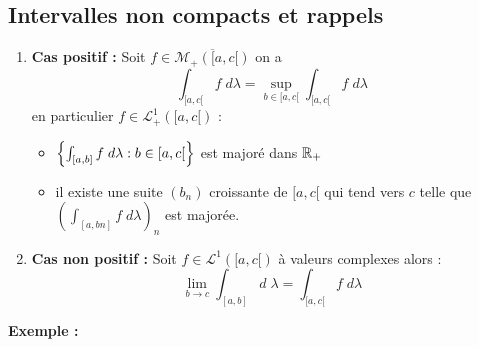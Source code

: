 \subsection{Intervalles non compacts et rappels}
\begin{theorem}
    \begin{enumerate}
        \item \textbf{Cas positif :} Soit $f \in \overline{\mathcal{M}_+([a,c[)}$ on a 
        \[ \boxed{ \int_{[a,c[} f \; d \lambda = \underset{b \in [a,c[}{\sup} \int_{[a,c[} f \; d \lambda} \]
        en particulier $ f \in \mathcal{L}^1_+([a,c[)$ :
        \begin{itemize}
            \item[\underline{ssi}] $\Bigl\{ \int_{[a,b]} f \; d \lambda : b \in [a,c[ \Bigr\}$ est majoré dans $\mathbb{R}_+$ 
            \item[\underline{ssi}] il existe une suite $(b_n)$ croissante de $[a,c[$ qui tend vers $c$ telle que $ (\int_{[a,bn]} f \; d \lambda)_n$ est majorée.
        \end{itemize}
        \item \textbf{Cas non positif :} Soit $ f \in \mathcal{L}^1([a,c[)$ à valeurs complexes alors :
            \[ \boxed{ \lim_{b \to c} \int_{[a,b]} d \; \lambda = \int_{[a,c[} f \; d \lambda} \] 
    \end{enumerate}
\end{theorem}

\textbf{Exemple :}

